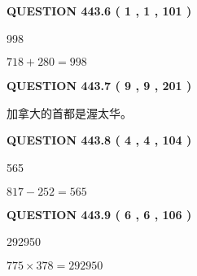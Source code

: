 \documentclass{ctexart}
\begin{document}
{\textbf{\Large{QUESTION
443.6 
 ( 1 , 1 , 101 )
}}}
  
  
 
 
\noindent{}

998
 
 
 
 
\noindent{}

$ %
718 +  %
280=   %
998$
 
 
  
\vspace{0.2in}
  
{\textbf{\Large{QUESTION
443.7 
 ( 9 , 9 , 201 )
}}}
  
  
 
 
\noindent{}
 
 
加拿大的首都是渥太华。
 
 
 
 
  
\vspace{0.2in}
  
{\textbf{\Large{QUESTION
443.8 
 ( 4 , 4 , 104 )
}}}
  
  
 
 
\noindent{}

565
 
 
 
 
\noindent{}

$ %
817 -  %
252=   %
565$
 
 
  
\vspace{0.2in}
  
{\textbf{\Large{QUESTION
443.9 
 ( 6 , 6 , 106 )
}}}
  
  
 
 
\noindent{}

292950
 
 
 
 
\noindent{}

$ %
775 \times  %
378=   %
292950$
 
 
  
\end{document}
